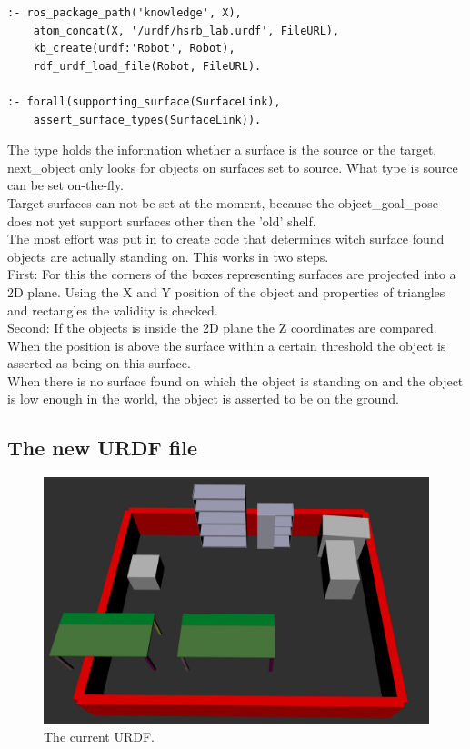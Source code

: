 \documentclass[main.tex]{subfiles}
\begin{document}
		
		\begin{lstlisting}
:- ros_package_path('knowledge', X),
	atom_concat(X, '/urdf/hsrb_lab.urdf', FileURL),
	kb_create(urdf:'Robot', Robot),
	rdf_urdf_load_file(Robot, FileURL).	
		
:- forall(supporting_surface(SurfaceLink),
	assert_surface_types(SurfaceLink)).
		\end{lstlisting}
		
		
		The type holds the information whether a surface is the source or the target. next\_object only looks for objects on surfaces set to source. What type is source can be set on-the-fly.\\
		
		Target surfaces can not be set at the moment, because the object\_goal\_pose does not yet support surfaces other then the 'old' shelf.\\
		
		The most effort was put in to create code that determines witch surface found objects are actually standing on. This works in two steps.\\
		First: For this the corners of the boxes representing surfaces are projected into a 2D plane. Using the X and Y position of the object and properties of triangles and rectangles the validity is checked.\\
		Second: If the objects is inside the 2D plane the Z coordinates are compared. When the position is above the surface within a certain threshold the object is asserted as being on this surface.\\
		When there is no surface found on which the object is standing on and the object is low enough in the world, the object is asserted to be on the ground.\\
		
		
		\subsection{The new URDF file}
		
		\begin{figure}[H]
		\centering
		\includegraphics[width=0.7\linewidth]{pictures/knowledge_urdf.png}
		\caption{The current URDF.}
		\label{fig:knowledge_urdf}
		\end{figure}
		
\end{document}
